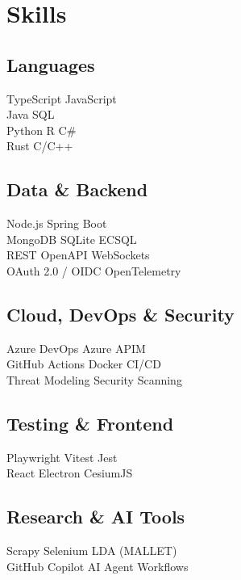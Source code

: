 \documentclass[]{deedy-resume-openfont}
\begin{document}
\begin{minipage}[t]{0.33\textwidth}

\section{Skills}
\subsection{Languages}
TypeScript \textbullet{} JavaScript \\
Java \textbullet{} SQL \\
Python \textbullet{} R \textbullet{} C\# \\
Rust \textbullet{} C/C++ \\
\sectionsep
\subsection{Data \& Backend}
Node.js \textbullet{} Spring Boot \\
MongoDB \textbullet{} SQLite \textbullet{} ECSQL \\
REST \textbullet{} OpenAPI \textbullet{} WebSockets \\
OAuth 2.0 / OIDC \textbullet{} OpenTelemetry \\
\sectionsep
\subsection{Cloud, DevOps \& Security}
Azure DevOps \textbullet{} Azure APIM \\
GitHub Actions \textbullet{} Docker \textbullet{} CI/CD \\
Threat Modeling \textbullet{} Security Scanning \\
\sectionsep
\subsection{Testing \& Frontend}
Playwright \textbullet{} Vitest \textbullet{} Jest \\
React \textbullet{} Electron \textbullet{} CesiumJS \\
\sectionsep
\subsection{Research \& AI Tools}
Scrapy \textbullet{} Selenium \textbullet{} LDA (MALLET) \\
GitHub Copilot \textbullet{} AI Agent Workflows \\
\sectionsep

\end{minipage}
\end{document}

